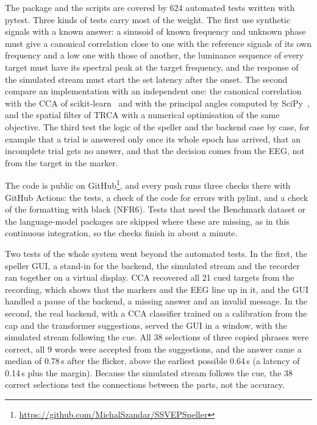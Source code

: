 The package and the scripts are covered by 624 automated tests written with pytest.
Three kinds of tests carry most of the weight. The first use synthetic signals with a
known answer: a sinusoid of known frequency and unknown phase must give a canonical
correlation close to one with the reference signals of its own frequency and a low one
with those of another, the luminance sequence of every target must have its spectral
peak at the target frequency, and the response of the simulated stream must start the
set latency after the onset. The second compare an implementation with an independent
one: the canonical correlation with the \ac{CCA} of
scikit-learn~\citep{pedregosa2011sklearn} and with the principal angles computed by
SciPy~\citep{virtanen2020scipy}, and the spatial filter of \ac{TRCA} with a numerical
optimisation of the same objective. The third test the logic of the speller and the
backend case by case, for example that a trial is answered only once its whole epoch
has arrived, that an incomplete trial gets no answer, and that the decision comes from
the \ac{EEG}, not from the target in the marker.

The code is public on GitHub\footnote{\url{https://github.com/MichalSzandar/SSVEPSpeller}},
and every push runs three checks there with GitHub Actions: the tests, a check of the
code for errors with pylint, and a check of the formatting with black (NFR6). Tests that
need the Benchmark dataset or the language-model packages are skipped where these are
missing, as in this continuous integration, so the checks finish in about a minute.

Two tests of the whole system went beyond the automated tests. In the first, the speller
\ac{GUI}, a stand-in for the backend, the simulated stream and the recorder ran
together on a virtual display. \ac{CCA} recovered all 21 cued targets from the
recording, which shows that the markers and the \ac{EEG} line up in it, and the
\ac{GUI} handled a pause of the backend, a missing answer and an invalid message. In
the second, the real backend, with a \ac{CCA} classifier trained on a calibration from
the cap and the transformer suggestions, served the \ac{GUI} in a window, with the
simulated stream following the cue. All 38 selections of three copied phrases were
correct, all 9 words were accepted from the suggestions, and the answer came a median
of 0.78\,s after the flicker, above the earliest possible 0.64\,s (a latency of 0.14\,s
plus the margin). Because the simulated stream follows the cue, the 38 correct
selections test the connections between the parts, not the accuracy.

